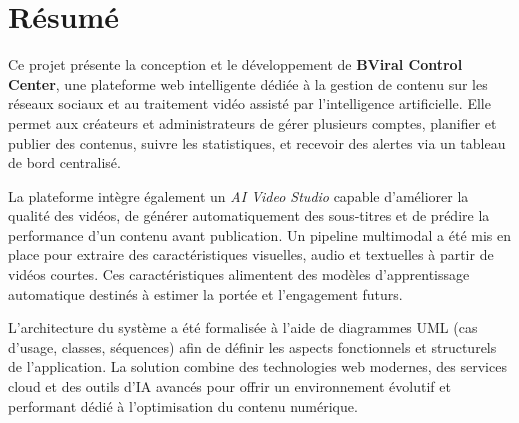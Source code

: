 \chapter*{Résumé}
Ce projet présente la conception et le développement de \textbf{BViral Control Center}, une plateforme web intelligente dédiée à la gestion de contenu sur les réseaux sociaux et au traitement vidéo assisté par l’intelligence artificielle. Elle permet aux créateurs et administrateurs de gérer plusieurs comptes, planifier et publier des contenus, suivre les statistiques, et recevoir des alertes via un tableau de bord centralisé.

La plateforme intègre également un \emph{AI Video Studio} capable d’améliorer la qualité des vidéos, de générer automatiquement des sous‑titres et de prédire la performance d’un contenu avant publication. Un pipeline multimodal a été mis en place pour extraire des caractéristiques visuelles, audio et textuelles à partir de vidéos courtes. Ces caractéristiques alimentent des modèles d’apprentissage automatique destinés à estimer la portée et l’engagement futurs.

L’architecture du système a été formalisée à l’aide de diagrammes UML (cas d’usage, classes, séquences) afin de définir les aspects fonctionnels et structurels de l’application. La solution combine des technologies web modernes, des services cloud et des outils d’IA avancés pour offrir un environnement évolutif et performant dédié à l’optimisation du contenu numérique.

